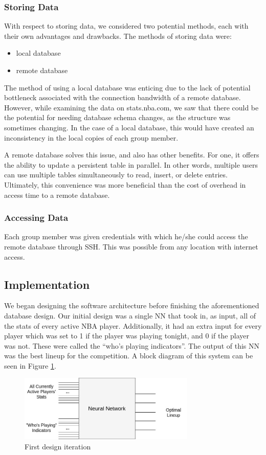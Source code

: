 \subsubsection{Storing Data}
With respect to storing data, we considered two potential methods, each with their own advantages and drawbacks. The methods of storing data were:
\begin{itemize}
\item local database
\item remote database
\end{itemize}
The method of using a local database was enticing due to the lack of potential bottleneck associated with the connection bandwidth of a remote database. However, while examining the data on stats.nba.com, we saw that there could be the potential for needing database schema changes, as the structure was sometimes changing. In the case of a local database, this would have created an inconsistency in the local copies of each group member.

A remote database solves this issue, and also has other benefits. For one, it offers the ability to update a persistent table in parallel. In other words, multiple users can use multiple tables simultaneously to read, insert, or delete entries. Ultimately, this convenience was more beneficial than the cost of overhead in access time to a remote database.

\subsubsection{Accessing Data}
Each group member was given credentials with which he/she could access the remote database through SSH. This was possible from any location with internet access.

\subsection{Implementation}
We began designing the software architecture before finishing the aforementioned database design. Our initial design was a single NN that took in, as input, all of the stats of every active NBA player. Additionally, it had an extra input for every player which was set to 1 if the player was playing tonight, and 0 if the player was not.  These were called the ``who's playing indicators''. The output of this NN was the best lineup for the competition. A block diagram of this system can be seen in Figure \ref{fig:first_iteration}.
\begin{figure}[ht]
    \centering
    \includegraphics[width=0.75\textwidth]{figures/first_iteration}
    \caption{First design iteration}
    \label{fig:first_iteration}
\end{figure}
 
